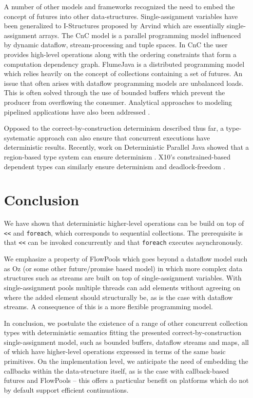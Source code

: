\documentclass[runningheads,a4paper]{llncs}
\begin{document}
A number of other models and frameworks recognized the need to embed
the concept of futures into other data-structures.
Single-assignment variables have been generalized to I-Structures
proposed by Arvind \cite{Arvind89} which are essentially
single-assignment arrays.
The CnC model \cite{Burke11} \cite{CnC10} is a parallel programming model
influenced by dynamic dataflow, stream-processing and tuple spaces.
In CnC the user provides high-level operations along with the ordering
constraints that form a computation dependency graph.
FlumeJava \cite{Chambers10} is a distributed programming model which
relies heavily on the concept of collections containing a set of
futures.
An issue that often arises with dataflow programming models are
unbalanced loads.
This is often solved through the use of bounded buffers which prevent
the producer from overflowing the consumer.
Analytical approaches to modeling pipelined applications have also
been addressed \cite{Cascaval09}.

Opposed to the correct-by-construction determinism described thus far,
a type-systematic approach can also ensure that concurrent executions
have deterministic results.
Recently, work on Deterministic Parallel Java showed that a
region-based type system can ensure determinism \cite{Bocchino09}.
X10's constrained-based dependent types can similarly ensure
determinism and deadlock-freedom \cite{Saraswat07}.


\section{Conclusion}

We have shown that deterministic higher-level operations can be build
on top of \verb=<<= and \verb=foreach=, which corresponds to
sequential collections.
The prerequisite is that \verb=<<= can be invoked concurrently and
that \verb=foreach= executes asynchronously.

We emphasize a property of FlowPools which goes beyond
a dataflow model such as Oz (or some other future/promise based
model) in which more complex data structures such as streams are built
on top of single-assignment variables.
With single-assignment pools multiple threads can add elements without
agreeing on where the added element should structurally be, as is the
case with dataflow streams.
A consequence of this is a more flexible programming model.

In conclusion, we postulate the existence of a range of other
concurrent collection types with deterministic semantics fitting the
presented correct-by-construction single-assignment model, such as
bounded buffers, dataflow streams and maps, all of which have
higher-level operations expressed in terms of the same basic
primitives.
On the implementation level, we anticipate the need of embedding the
callbacks within the data-structure itself, as is the case with
callback-based futures and FlowPools -- this offers a particular
benefit on platforms which do not by default support efficient
continuations.
\end{document}
